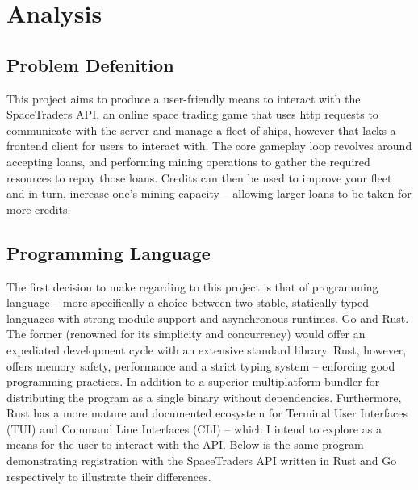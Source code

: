 \section{Analysis}
\subsection{Problem Defenition}
This project aims to produce a user-friendly means to interact with the SpaceTraders API, an online space trading game that uses http requests to communicate with the server and manage a fleet of ships, however that lacks a frontend client for users to interact with. The core gameplay loop revolves around accepting loans, and performing mining operations to gather the required resources to repay those loans. Credits can then be used to improve your fleet and in turn, increase one's mining capacity – allowing larger loans to be taken for more credits.

\subsection{Programming Language}
The first decision to make regarding to this project is that of programming language – more specifically a choice between two stable, statically typed languages with strong module support and asynchronous runtimes. Go and Rust. The former (renowned for its simplicity and concurrency) would offer an expediated development cycle with an extensive standard library. Rust, however, offers memory safety, performance and a strict typing system – enforcing good programming practices. In addition to a superior multiplatform bundler for distributing the program as a single binary without dependencies. Furthermore, Rust has a more mature and documented ecosystem for Terminal User Interfaces (TUI) and Command Line Interfaces (CLI) – which I intend to explore as a means for the user to interact with the API. Below is the same program demonstrating registration with the SpaceTraders API written in Rust and Go respectively to illustrate their differences. 

